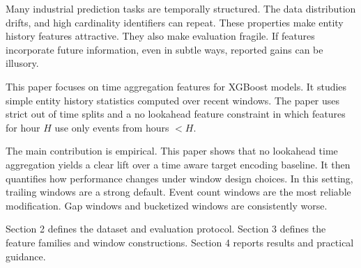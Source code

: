 Many industrial prediction tasks are temporally structured.
The data distribution drifts, and high cardinality identifiers can repeat.
These properties make entity history features attractive.
They also make evaluation fragile.
If features incorporate future information, even in subtle ways, reported gains can be illusory.

This paper focuses on time aggregation features for XGBoost models.
It studies simple entity history statistics computed over recent windows.
The paper uses strict out of time splits and a no lookahead feature constraint in which features for hour $H$ use only events from hours $< H$.

The main contribution is empirical.
This paper shows that no lookahead time aggregation yields a clear lift over a time aware target encoding baseline.
It then quantifies how performance changes under window design choices.
In this setting, trailing windows are a strong default.
Event count windows are the most reliable modification.
Gap windows and bucketized windows are consistently worse.

Section 2 defines the dataset and evaluation protocol.
Section 3 defines the feature families and window constructions.
Section 4 reports results and practical guidance.
